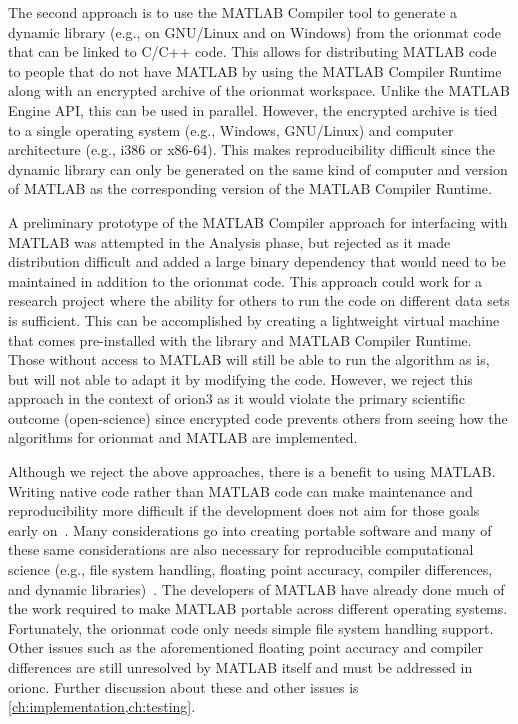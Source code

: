 {
	The second approach is to use the MATLAB Compiler tool
	to generate a dynamic library (e.g.,  on GNU/Linux and
	 on Windows)
	from the \gls{orionmat} code that can be linked to C/C++ code.
	This allows for
	distributing MATLAB code to people that do not have
	MATLAB by using the MATLAB Compiler Runtime along with an
	encrypted archive of the \gls{orionmat} workspace. Unlike
	the MATLAB Engine API, this can be used in parallel.
	However, the encrypted archive is tied to a single
	operating system (e.g., Windows, GNU/Linux) and computer
	architecture (e.g., i386 or x86-64). This makes
	reproducibility difficult since the dynamic library can
	only be generated on the same kind of computer and version
	of MATLAB as the corresponding version of the MATLAB
	Compiler Runtime.

	A preliminary prototype of the MATLAB Compiler approach
	for interfacing with MATLAB was attempted in the Analysis
	phase, but rejected as it made distribution difficult and
	added a large binary dependency that would need to
	be maintained in addition to the \gls{orionmat} code. This
	approach could work for a research project where the
	ability for others to run the code on different data sets
	is sufficient. This can be accomplished by creating a
	lightweight virtual machine that comes pre-installed with
	the library and MATLAB Compiler Runtime. Those without
	access to MATLAB will still be able to run the algorithm
	as is, but will not able to adapt it by modifying the
	code. However, we reject this approach in the context of
	\gls{orion3} as it would violate the primary scientific
	outcome (open-science) since encrypted code prevents
	others from seeing how the algorithms for \gls{orionmat}
	and MATLAB are implemented.
}

Although we reject the above approaches, there is a benefit to
using MATLAB. Writing native code rather than MATLAB code can
make maintenance and reproducibility more difficult if the
development does not aim for those goals early on~\autocite{Donoho2009,Collberg2015}.
Many considerations go into creating portable software and many of
these same considerations are also necessary for reproducible
computational science (e.g., file system handling, floating point accuracy,
compiler differences, and dynamic libraries)~\autocite{PortableCode:Hook:2005}.
The developers of MATLAB have already done much of the work required
to make MATLAB portable across different operating systems.
Fortunately, the \gls{orionmat} code only needs simple file system
handling support. Other issues such as the aforementioned floating
point accuracy and compiler differences are still unresolved by
MATLAB itself and must be addressed in \gls{orionc}. Further
discussion about these and other issues is \cref{ch:implementation,ch:testing}.

